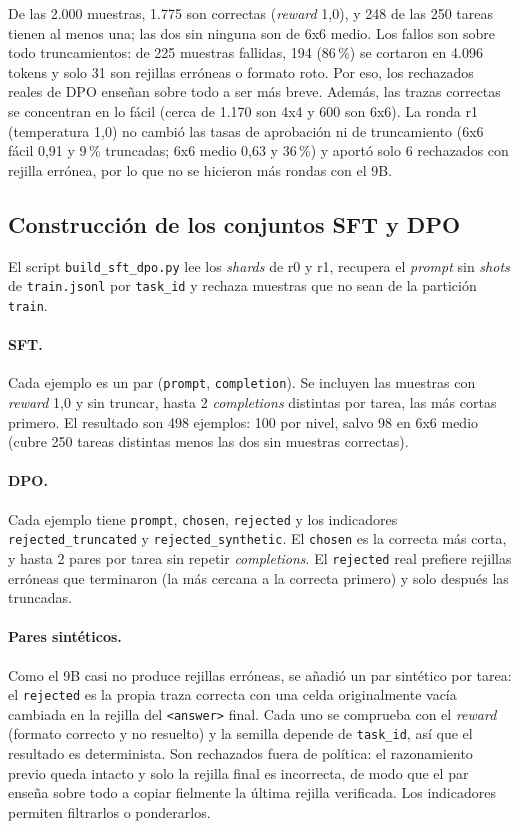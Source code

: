 De las 2.000 muestras, 1.775 son correctas (\emph{reward} 1,0), y 248 de las 250
tareas tienen al menos una; las dos sin ninguna son de 6x6 medio. Los fallos son
sobre todo truncamientos: de 225 muestras fallidas, 194 (86\,\%) se cortaron en
4.096 tokens y solo 31 son rejillas erróneas o formato roto. Por eso, los
rechazados reales de DPO enseñan sobre todo a ser más breve. Además, las trazas
correctas se concentran en lo fácil (cerca de 1.170 son 4x4 y 600 son 6x6). La
ronda r1 (temperatura 1,0) no cambió las tasas de aprobación ni de truncamiento
(6x6 fácil 0,91 y 9\,\% truncadas; 6x6 medio 0,63 y 36\,\%) y aportó solo 6
rechazados con rejilla errónea, por lo que no se hicieron más rondas con el 9B.

\subsection{Construcción de los conjuntos SFT y DPO}
\label{sec:traces-datasets}

El script \texttt{build\_sft\_dpo.py} lee los \emph{shards} de r0 y r1, recupera el
\emph{prompt} sin \emph{shots} de \texttt{train.jsonl} por \texttt{task\_id} y
rechaza muestras que no sean de la partición \texttt{train}.

\paragraph{SFT.} Cada ejemplo es un par (\texttt{prompt}, \texttt{completion}).
Se incluyen las muestras con \emph{reward} 1,0 y sin truncar, hasta 2
\emph{completions} distintas por tarea, las más cortas primero. El resultado son
498 ejemplos: 100 por nivel, salvo 98 en 6x6 medio (cubre 250 tareas distintas
menos las dos sin muestras correctas).

\paragraph{DPO.} Cada ejemplo tiene \texttt{prompt}, \texttt{chosen},
\texttt{rejected} y los indicadores \texttt{rejected\_truncated} y
\texttt{rejected\_synthetic}. El \texttt{chosen} es la correcta más corta, y hasta
2 pares por tarea sin repetir \emph{completions}. El \texttt{rejected} real
prefiere rejillas erróneas que terminaron (la más cercana a la correcta primero) y
solo después las truncadas.

\paragraph{Pares sintéticos.} Como el 9B casi no produce rejillas erróneas, se
añadió un par sintético por tarea: el \texttt{rejected} es la propia traza correcta
con una celda originalmente vacía cambiada en la rejilla del \texttt{<answer>}
final. Cada uno se comprueba con el \emph{reward} (formato correcto y no
resuelto) y la semilla depende de \texttt{task\_id}, así que el resultado es
determinista. Son rechazados fuera de política: el razonamiento previo queda
intacto y solo la rejilla final es incorrecta, de modo que el par enseña sobre todo
a copiar fielmente la última rejilla verificada. Los indicadores permiten
filtrarlos o ponderarlos.

